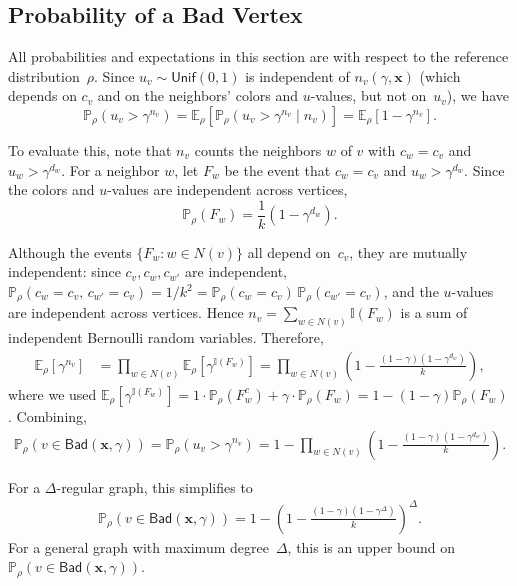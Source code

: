 \documentclass[12pt, a4paper]{article}
\theoremstyle{plain}
\theoremstyle{definition}
\theoremstyle{remark}
\newcommand{\ind}{\mathbb{I}}
\newcommand{\mbb}{\mathbb}
\renewcommand{\v}[1]{\boldsymbol{#1}}
\newcommand{\pp}{\mathbb{P}}
\newcommand{\mx}{\v{x}}
\newcommand{\unif}{\mathsf{Unif}}
\newcommand{\bad}{\mathsf{Bad}}
\begin{document}
\subsection{Probability of a Bad Vertex}

All probabilities and expectations in this section are with respect to the reference distribution~\(\rho\). Since \(u_v\sim\unif(0,1)\) is independent of \(n_v(\gamma,\mx)\) (which depends on \(c_v\) and on the neighbors' colors and \(u\)-values, but not on~\(u_v\)), we have
\[\mbb P_\rho(u_v>\gamma^{n_v})=\mbb E_\rho\left[\mbb P_\rho(u_v>\gamma^{n_v}\mid n_v)\right]=\mbb E_\rho\left[1-\gamma^{n_v}\right].\]

To evaluate this, note that \(n_v\) counts the neighbors \(w\) of \(v\) with \(c_w=c_v\) and \(u_w>\gamma^{d_w}\). For a neighbor \(w\), let \(F_w\) be the event that \(c_w=c_v\) and \(u_w>\gamma^{d_w}\). Since the colors and \(u\)-values are independent across vertices,
\[\mbb P_\rho(F_w)=\frac{1}{k}(1-\gamma^{d_w}).\]

Although the events \(\{F_w:w\in N(v)\}\) all depend on~\(c_v\), they are mutually independent: since \(c_v,c_w,c_{w'}\) are independent, \(\pp_\rho(c_w=c_v,\,c_{w'}=c_v)=1/k^2=\pp_\rho(c_w=c_v)\,\pp_\rho(c_{w'}=c_v)\), and the \(u\)-values are independent across vertices. Hence \(n_v=\sum_{w\in N(v)}\ind(F_w)\) is a sum of independent Bernoulli random variables. Therefore,
\begin{align}\label{eqn:E_gamma_nv}
\mbb E_\rho\left[\gamma^{n_v}\right]&=\prod_{w\in N(v)}\mbb E_\rho\left[\gamma^{\ind(F_w)}\right]=\prod_{w\in N(v)}\left(1-\frac{(1-\gamma)(1-\gamma^{d_w})}{k}\right),
\end{align}
where we used \(\mbb E_\rho[\gamma^{\ind(F_w)}]=1\cdot\mbb P_\rho(F_w^c)+\gamma\cdot\mbb P_\rho(F_w)=1-(1-\gamma)\mbb P_\rho(F_w)\). Combining,
\begin{align}\label{eqn:P_bad}
\mbb P_\rho(v\in\bad(\mx,\gamma))=\mbb P_\rho(u_v>\gamma^{n_v})=1-\prod_{w\in N(v)}\left(1-\frac{(1-\gamma)(1-\gamma^{d_w})}{k}\right).
\end{align}

For a \(\Delta\)-regular graph, this simplifies to
\begin{align}\label{eqn:P_bad_regular}
\mbb P_\rho(v\in\bad(\mx,\gamma))=1-\left(1-\frac{(1-\gamma)(1-\gamma^{\Delta})}{k}\right)^{\Delta}.
\end{align}
For a general graph with maximum degree~\(\Delta\), this is an upper bound on \(\mbb P_\rho(v\in\bad(\mx,\gamma))\).
\end{document}
